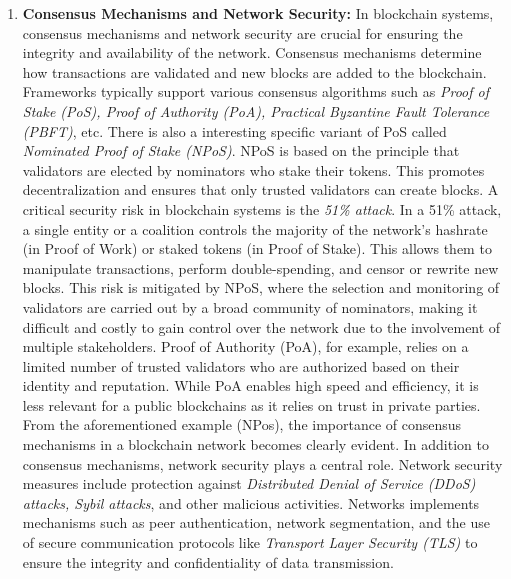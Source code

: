 \begin{enumerate}[label=\textbullet]
	\item\textbf{Consensus Mechanisms and Network Security:}\cite{sub_consens}\cite{polkadot_paper}
	In blockchain systems, consensus mechanisms and network security are crucial for ensuring the integrity and availability of the network. Consensus mechanisms determine how transactions are validated and new blocks are added to the blockchain. Frameworks typically support various consensus algorithms such as \textit{Proof of Stake (PoS), Proof of Authority (PoA), Practical Byzantine Fault Tolerance (PBFT)}, etc.
	There is also a interesting specific variant of PoS called \textit{Nominated Proof of Stake (NPoS)}. NPoS is based on the principle that validators are elected by nominators who stake their tokens. This promotes decentralization and ensures that only trusted validators can create blocks. A critical security risk in blockchain systems is the \textit{51\% attack}. In a 51\% attack, a single entity or a coalition controls the majority of the network's hashrate (in Proof of Work) or staked tokens (in Proof of Stake). This allows them to manipulate transactions, perform double-spending, and censor or rewrite new blocks. This risk is mitigated by NPoS, where the selection and monitoring of validators are carried out by a broad community of nominators, making it difficult and costly to gain control over the network due to the involvement of multiple stakeholders.
	Proof of Authority (PoA), for example, relies on a limited number of trusted validators who are authorized based on their identity and reputation. While PoA enables high speed and efficiency, it is less relevant for a public blockchains as it relies on trust in private parties. From the aforementioned example (NPos), the importance of consensus mechanisms in a blockchain network becomes clearly evident.
	In addition to consensus mechanisms, network security plays a central role. Network security measures include protection against \textit{Distributed Denial of Service (DDoS) attacks, Sybil attacks}, and other malicious activities. Networks implements mechanisms such as peer authentication, network segmentation, and the use of secure communication protocols like \textit{Transport Layer Security (TLS)} to ensure the integrity and confidentiality of data transmission.


\end{enumerate}
